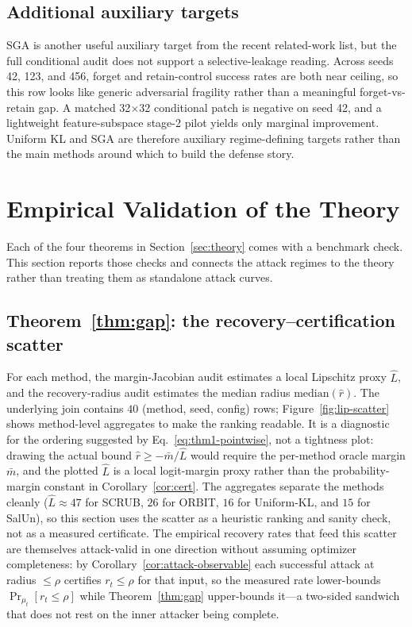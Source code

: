 \documentclass[11pt]{article}
\begin{document}
\subsection{Additional auxiliary targets}
SGA is another useful auxiliary target from the recent related-work list, but the full conditional audit does not support a selective-leakage reading. Across seeds 42, 123, and 456, forget and retain-control success rates are both near ceiling, so this row looks like generic adversarial fragility rather than a meaningful forget-vs-retain gap. A matched 32$\times$32 conditional patch is negative on seed 42, and a lightweight feature-subspace stage-2 pilot yields only marginal improvement. Uniform KL and SGA are therefore auxiliary regime-defining targets rather than the main methods around which to build the defense story.



\section{Empirical Validation of the Theory}
\label{sec:validation}
Each of the four theorems in Section~\ref{sec:theory} comes with a benchmark check. This section reports those checks and connects the attack regimes to the theory rather than treating them as standalone attack curves.

\subsection{Theorem~\ref{thm:gap}: the recovery--certification scatter}
For each method, the margin-Jacobian audit estimates a local Lipschitz proxy $\hat L$, and the recovery-radius audit estimates the median radius $\mathrm{median}(\hat r)$. The underlying join contains $40$ (method, seed, config) rows; Figure~\ref{fig:lip-scatter} shows method-level aggregates to make the ranking readable. It is a diagnostic for the ordering suggested by Eq.~\eqref{eq:thm1-pointwise}, not a tightness plot: drawing the actual bound $\hat r \geq -\bar m/\hat L$ would require the per-method oracle margin $\bar m$, and the plotted $\hat L$ is a local logit-margin proxy rather than the probability-margin constant in Corollary~\ref{cor:cert}. The aggregates separate the methods cleanly ($\hat L \approx 47$ for SCRUB, $26$ for ORBIT, $16$ for Uniform-KL, and $15$ for SalUn), so this section uses the scatter as a heuristic ranking and sanity check, not as a measured certificate. The empirical recovery rates that feed this scatter are themselves attack-valid in one direction without assuming optimizer completeness: by Corollary~\ref{cor:attack-observable} each successful attack at radius $\le\rho$ certifies $r_t\le\rho$ for that input, so the measured rate lower-bounds $\Pr_{\mu_t}[r_t\le\rho]$ while Theorem~\ref{thm:gap} upper-bounds it---a two-sided sandwich that does not rest on the inner attacker being complete.
\end{document}
